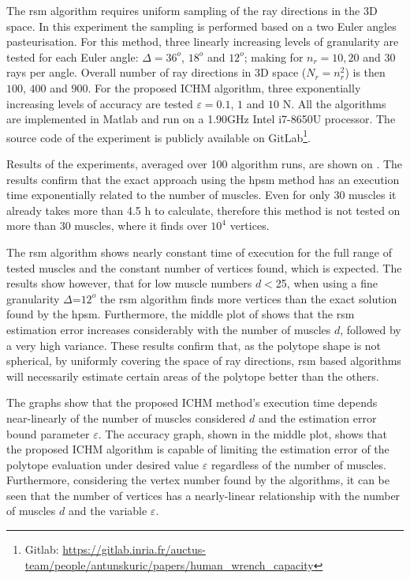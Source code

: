 The \gls{rsm} algorithm \cite{carmichael2011Towards} requires uniform sampling of the ray directions in the 3D space. In this experiment the sampling is performed based on a two Euler angles pasteurisation. {For this method, three linearly increasing levels of granularity are tested for each Euler angle: $\Delta\!=\!36^o$, $18^o$ and $12^o$;  making for $n_r\!=\!10,20$ and $30$ rays per angle. Overall number of ray directions in 3D space ($N_r\!=\!n_r^2$) is then $100$, $400$ and $900$. For the proposed ICHM algorithm, three exponentially increasing levels of accuracy are tested $\varepsilon\!=\!0.1$, $1$ and $10$ N.} All the algorithms are implemented in Matlab and run on a 1.90GHz Intel i7-8650U processor. The source code of the experiment is publicly available on GitLab\footnote{Gitlab: \url{https://gitlab.inria.fr/auctus-team/people/antunskuric/papers/human_wrench_capacity}}.

Results of the experiments, averaged over 100 algorithm runs, are shown on . The results confirm that the exact approach using the \gls{hpsm} method has an execution time exponentially related to the number of muscles. Even for only 30 muscles it already takes more than 4.5 h to calculate, therefore this method is not tested on more than 30 muscles, where it finds over $10^4$ vertices.  

The \gls{rsm} algorithm shows nearly constant time of execution for the full range of tested muscles and the constant number of vertices found, which is expected. The results show however, that for low muscle numbers $d\!<$25, when using a fine granularity $\Delta$=$12^o$ the \gls{rsm} algorithm finds more vertices than the exact solution found by the \gls{hpsm}. Furthermore, the middle plot of  shows that the \gls{rsm} estimation error increases considerably with the number of muscles $d$, followed by a very
high variance. These results confirm that, as the polytope shape is not spherical, by uniformly covering the space of ray directions, \gls{rsm} based algorithms will necessarily estimate certain areas of the polytope better than the others.

The graphs show that the proposed ICHM method's execution time depends near-linearly of the number of muscles considered $d$ and the estimation error bound parameter $\varepsilon$. The accuracy graph, shown in the middle plot, shows that the proposed ICHM algorithm is capable of limiting the estimation error of the polytope evaluation under desired value $\varepsilon$ regardless of the number of muscles. Furthermore, considering the vertex number found by the algorithms, it can be seen that the number of vertices has a nearly-linear relationship with the number of muscles $d$ and the variable $\varepsilon$. 

